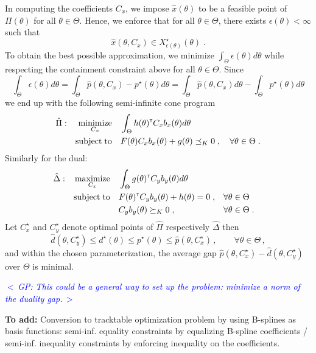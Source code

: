 \documentclass{article}
\renewcommand{\t}{^{\mbox{\tiny \sf T}}}    %
\newcommand{\ppar}{\theta}                  %
\newcommand{\Ppar}{\Theta}                  %
\DeclareMathOperator*{\minimize}{minimize}
\DeclareMathOperator*{\maximize}{maximize}
\DeclareMathOperator*{\subj}{subject\;to}
\newcommand{\commentGP}[1]{\noindent \textcolor{blue}{\emph{$<\,$GP: #1$\,>$}}}%
\begin{document}
In computing the coefficients $C_x$, we impose $\hat{x}(\ppar)$ to be a feasible point of $\Pi(\ppar)$ for all $\ppar\in\Ppar$. Hence, we enforce that for all $\ppar\in\Ppar$, there exists $\epsilon(\ppar)<\infty$ such that
\[ \hat{x}(\ppar, C_x) \in X^\star_{\epsilon(\ppar)}(\ppar) \;.
\]
To obtain the best possible approximation, we minimize $\int_{\Ppar}\epsilon(\ppar)d\ppar$ while respecting the containment constraint above for all $\ppar\in\Ppar$. Since
\[ \int_{\Ppar}\epsilon(\ppar)d\ppar = \int_{\Ppar}\hat{p}(\ppar, C_x)-p^\star(\ppar)d\ppar = \int_{\Ppar}\hat{p}(\ppar,C_x)d\ppar-\int_{\Ppar}p^\star(\ppar)d\ppar%
\]
we end up with the following semi-infinite cone program
\begin{gather}\label{eq:semi-inf_primal}
\begin{aligned}
\hat{\Pi}: && \minimize_{C_x} &&& \int_{\Ppar} h(\ppar)\t  C_x b_x(\ppar) d\ppar\\%
           && \subj           &&& F(\ppar) C_x b_x(\ppar)+g(\ppar)\preceq_K 0 \;, \quad\forall\ppar\in\Ppar\;.%
\end{aligned}
\end{gather}
Similarly for the dual:
\begin{gather}\label{eq:semi-inf_dual}
\begin{aligned}
\hat{\Delta}: && \maximize_{C_x} &&& \int_{\Ppar} g(\ppar)\t  C_y b_y(\ppar) d\ppar\\%
              && \subj           &&& F(\ppar)\t  C_y b_y(\ppar) + h(\ppar)= 0 \;, &&\forall\ppar\in\Ppar\\%
              &&                 &&&  C_y b_y(\ppar)\succeq_K 0  \;, &&\forall\ppar\in\Ppar\;.%
\end{aligned}
\end{gather}
Let $C_x^\star$ and $C_y^\star$ denote optimal points of $\hat{\Pi}$ respectively $\hat{\Delta}$ then
\[ \hat{d}(\ppar,C_y^\star) \leq d^\star(\ppar) \leq p^\star(\ppar) \leq \hat{p}(\ppar,C_x^\star)\,,\qquad\forall\ppar\in\Ppar\,,%
\]
and within the chosen parameterization, the average gap $\hat{p}(\ppar,C_x^\star)-\hat{d}(\ppar,C_y^\star)$ over $\Ppar$ is minimal.

\commentGP{This could be a general way to set up the problem: minimize a norm of the duality gap.}


\vspace*{12pt}
\noindent\textbf{To add:} Conversion to tracktable optimization problem by using B-splines as basis functions: semi-inf. equality constraints by equalizing B-spline coefficients / semi-inf. inequality constraints by enforcing inequality on the coefficients.
\end{document}
